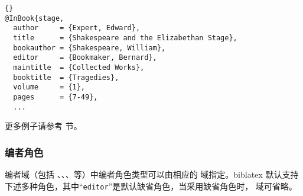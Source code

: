 \begin{lstlisting}[style=bibtex]{}
@InBook{stage,
  author     = {Expert, Edward},
  title      = {Shakespeare and the Elizabethan Stage},
  bookauthor = {Shakespeare, William},
  editor     = {Bookmaker, Bernard},
  maintitle  = {Collected Works},
  booktitle  = {Tragedies},
  volume     = {1},
  pages      = {7-49},
  ...
\end{lstlisting}
%
更多例子请参考  节。

\subsubsection{编者角色}
\label{bib:use:edr}

编者域（包括 、、、等）中编者角色类型可以由相应的 域指定。biblatex 默认支持下述多种角色，其中“\texttt{editor}”是默认缺省角色，当采用缺省角色时， 域可省略。

